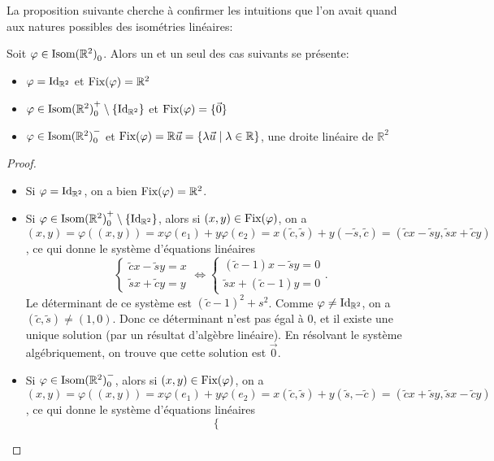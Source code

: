 \documentclass{book}
\numberwithin{equation}{section}
\renewcommand{\phi}{\varphi}
\providecommand{\plan}{{\mathbb R^2}}
\providecommand{\origin}{{\vec 0}}
\providecommand{\id}{{\textnormal{Id}}}
\providecommand{\IdR}{{\id_\plan}}
\providecommand{\isom}{{\textnormal{Isom}(\plan)}}
\providecommand{\isomo}{{\isom_0}}
\providecommand{\isomop}{\isom_0^+}
\providecommand{\isomom}{\isom_0^-}
\providecommand{\Fix}{{\textnormal{Fix}}}
\providecommand{\st}{\mid}
\begin{document}
La proposition suivante cherche à confirmer les intuitions que l'on avait quand aux natures possibles des isométries linéaires:
\begin{prop}
	Soit $\phi \in \isomo$. Alors un et un seul des cas suivants se présente:
	\begin{itemize}
		\item $\phi = \IdR$ et $\Fix(\phi) = \plan$
		\item $\phi \in \isomop \setminus \{\IdR\}$ et $\Fix(\phi) = \{\origin\}$
		\item $\phi \in \isomom$ et $\Fix(\phi) = \mathbb R \vec u = \{\lambda \vec u \st \lambda \in \mathbb R\}$, une droite linéaire de $\plan$
	\end{itemize}
\end{prop}
\begin{proof}
	\begin{itemize}
		\item Si $\phi = \IdR$, on a bien $\Fix(\phi) = \plan$.
		\item Si $\phi \in \isomop \setminus \{\IdR\}$, alors si $(x, y) \in \Fix(\phi)$, on a $(x, y) = \phi((x, y)) = x\phi(e_1) + y\phi(e_2) = x(\tilde c, \tilde s) + y(-\tilde s, \tilde c) = (\tilde cx - \tilde sy, \tilde sx + \tilde cy)$, ce qui donne le système d'équations linéaires
		\begin{equation*}
			\begin{cases}
				\tilde cx - \tilde sy = x\\
				\tilde sx + \tilde cy = y
			\end{cases} \iff
			\begin{cases}
				(\tilde c - 1)x - \tilde sy = 0\\
				\tilde sx + (\tilde c - 1)y = 0
			\end{cases}.
		\end{equation*}
		Le déterminant de ce système est $(\tilde c - 1)^2 + s^2$. Comme $\phi \neq \IdR$, on a $(\tilde c, \tilde s) \neq (1, 0)$. Donc ce déterminant n'est pas égal à 0, et il existe une unique solution (par un résultat d'algèbre linéaire). En résolvant le système algébriquement, on trouve que cette solution est $\origin$.
		\item Si $\phi \in \isomom$, alors si $(x, y) \in \Fix(\phi)$, on a $(x, y) = \phi((x, y)) = x\phi(e_1) + y\phi(e_2) = x(\tilde c, \tilde s) + y(\tilde s, -\tilde c) = (\tilde cx + \tilde sy, \tilde sx - \tilde cy)$, ce qui donne le système d'équations linéaires
		\begin{equation*}
			\begin{cases}				

\end{cases}
\end{equation*}
\end{itemize}
\end{proof}
\end{document}
